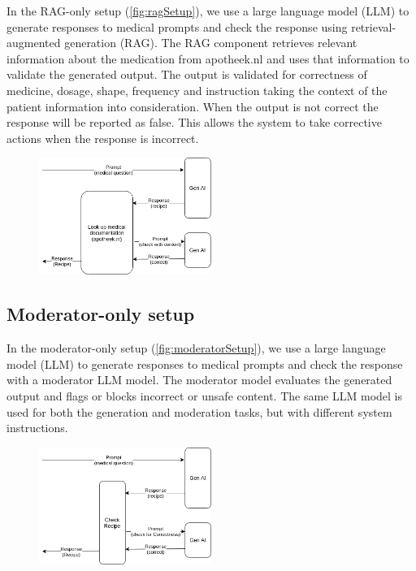 In the RAG-only setup (\autoref{fig:ragSetup}), we use a large language model (LLM) to generate responses to medical prompts and check the response using retrieval-augmented generation (RAG).
The RAG component retrieves relevant information about the medication from apotheek.nl and uses that information to validate the generated output.
The output is validated for correctness of medicine, dosage, shape, frequency and instruction taking the context of the patient information into consideration.
When the output is not correct the response will be reported as false.
This allows the system to take corrective actions when the response is incorrect.

\begin{figure}[H]
    \includegraphics[width=0.5\textwidth]{figures/RAGSetup.png}
    \label{fig:ragSetup}
\end{figure}

\subsection{Moderator-only setup}

In the moderator-only setup (\autoref{fig:moderatorSetup}), we use a large language model (LLM) to generate responses to medical prompts and check the response with a moderator LLM model.
The moderator model evaluates the generated output and flags or blocks incorrect or unsafe content.
The same LLM model is used for both the generation and moderation tasks, but with different system instructions.

\begin{figure}[H]
    \includegraphics[width=0.5\textwidth]{figures/moderatorSetup.png}
    \label{fig:moderatorSetup}
\end{figure}

